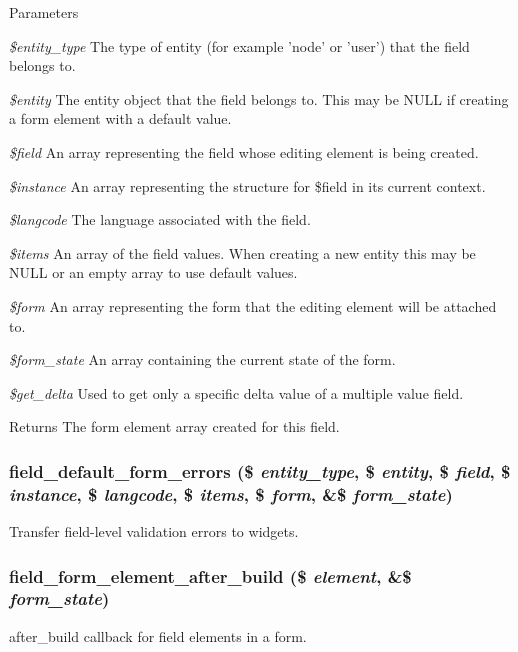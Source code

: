 \begin{DoxyParams}{Parameters}
\item[{\em \$entity\_\-type}]The type of entity (for example 'node' or 'user') that the field belongs to. \item[{\em \$entity}]The entity object that the field belongs to. This may be NULL if creating a form element with a default value. \item[{\em \$field}]An array representing the field whose editing element is being created. \item[{\em \$instance}]An array representing the structure for \$field in its current context. \item[{\em \$langcode}]The language associated with the field. \item[{\em \$items}]An array of the field values. When creating a new entity this may be NULL or an empty array to use default values. \item[{\em \$form}]An array representing the form that the editing element will be attached to. \item[{\em \$form\_\-state}]An array containing the current state of the form. \item[{\em \$get\_\-delta}]Used to get only a specific delta value of a multiple value field.\end{DoxyParams}
\begin{DoxyReturn}{Returns}
The form element array created for this field. 
\end{DoxyReturn}
\hypertarget{field_8form_8inc_a0649a57b5581c7896bcd997aa0e3e172}{
\subsubsection[{field\_\-default\_\-form\_\-errors}]{\setlength{\rightskip}{0pt plus 5cm}field\_\-default\_\-form\_\-errors (\$ {\em entity\_\-type}, \/  \$ {\em entity}, \/  \$ {\em field}, \/  \$ {\em instance}, \/  \$ {\em langcode}, \/  \$ {\em items}, \/  \$ {\em form}, \/  \&\$ {\em form\_\-state})}}
\label{field_8form_8inc_a0649a57b5581c7896bcd997aa0e3e172}
Transfer field-\/level validation errors to widgets. \hypertarget{field_8form_8inc_acf98217acdd07f36d9fa45f6d6d92e0d}{
\subsubsection[{field\_\-form\_\-element\_\-after\_\-build}]{\setlength{\rightskip}{0pt plus 5cm}field\_\-form\_\-element\_\-after\_\-build (\$ {\em element}, \/  \&\$ {\em form\_\-state})}}
\label{field_8form_8inc_acf98217acdd07f36d9fa45f6d6d92e0d}
after\_\-build callback for field elements in a form.

